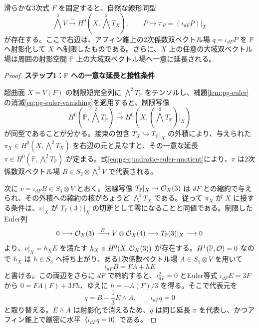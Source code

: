 \begin{proposition}\label{prop:pg-represent}
滑らかな3次式 $F$ を固定すると、自然な線形同型
\begin{equation}\label{eq:pg-representation-isomorphism}
\bigwedge^3V\xrightarrow{\sim}H^0(X,\bigwedge^2T_X),
\qquad P\longmapsto\pi_P=(\iota_{dF}P)|_X
\end{equation}
が存在する。ここで右辺は、アフィン錐上の2次係数双ベクトル場 $q=\iota_{dF}P$ を $\mathbb P$ へ射影化して $X$ へ制限したものである。さらに、$X$ 上の任意の大域双ベクトル場は周囲の射影空間 $\mathbb P$ 上の大域双ベクトル場へ一意に延長される。
\end{proposition}
\begin{proof}
\par\medskip\noindent\textbf{ステップ1：$\mathbb P$ への一意な延長と接性条件}\par\nobreak\smallskip
超曲面 $X=V(F)$ の制限短完全列に $\bigwedge^2T_{\mathbb P}$ をテンソルし、補題\ref{lem:pg-euler}の消滅\eqref{eq:pg-euler-vanishing}を適用すると、制限写像
\begin{equation}\label{eq:pg-ambient-restriction-isomorphism}
H^0(\mathbb P,\bigwedge^2T_{\mathbb P})
\xrightarrow{\sim}
H^0(X,(\bigwedge^2T_{\mathbb P})|_X)
\end{equation}
が同型であることが分かる。接束の包含 $T_X\hookrightarrow T_{\mathbb P}|_X$ の外積により、与えられた $\pi_X\in H^0(X,\bigwedge^2T_X)$ を右辺の元と見なすと、その一意な延長 $\pi\in H^0(\mathbb P,\bigwedge^2T_{\mathbb P})$ が定まる。式\eqref{eq:pg-quadratic-euler-quotient}により、$\pi$ は2次係数双ベクトル場 $B\in S_2\otimes\bigwedge^2V$ で代表される。

次に $v=\iota_{dF}B\in S_4\otimes V$ とおく。法線写像 $T_{\mathbb P}|_X\to\mathcal O_X(3)$ は $dF$ との縮約で与えられ、その外積への縮約の核がちょうど $\bigwedge^2T_X$ である。従って $\pi_X$ が $X$ に接する条件は、$v|_X$ が $T_{\mathbb P}(3)|_X$ の切断として零になることと同値である。制限したEuler列
\begin{equation}\label{eq:pg-twisted-euler-on-X}
0\longrightarrow\mathcal O_X(3)
\xrightarrow{\ E\ }V\otimes\mathcal O_X(4)
\longrightarrow T_{\mathbb P}(3)|_X\longrightarrow0
\end{equation}
より、$v|_X=h_X E$ を満たす $h_X\in H^0(X,\mathcal O_X(3))$ が存在する。$H^1(\mathbb P,\mathcal O)=0$ なので $h_X$ は $h\in S_3$ へ持ち上がり、ある1次係数ベクトル場 $A\in S_1\otimes V$ を用いて
\begin{equation}\label{eq:pg-tangency-correction}
\iota_{dF}B=FA+hE
\end{equation}
と書ける。この両辺をさらに $dF$ で縮約すると、$\iota_{dF}^2=0$ とEuler等式 $\iota_{dF}E=3F$ から $0=FA(F)+3Fh$、ゆえに $h=-A(F)/3$ を得る。そこで代表元を
\begin{equation}\label{eq:pg-horizontal-representative}
q=B-\frac13E\wedge A,\qquad\iota_{dF}q=0
\end{equation}
と取り替える。$E\wedge A$ は射影化で消えるため、$q$ は同じ延長 $\pi$ を代表し、かつアフィン錐上で厳密に水平（$\iota_{dF}q=0$）である。


\end{proof}

